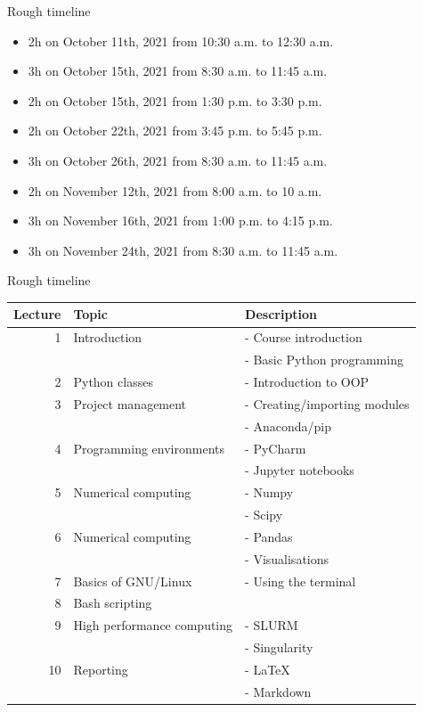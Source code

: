 \documentclass[10pt]{beamer}
\begin{document}
\begin{frame}[label={sec:orgb2e396a}]{Rough timeline}
\begin{itemize}
\item 2h on October 11th, 2021 from 10:30 a.m. to 12:30 a.m.
\item 3h on October 15th, 2021 from 8:30 a.m. to 11:45 a.m.
\item 2h on October 15th, 2021 from 1:30 p.m. to 3:30 p.m.
\item 2h on October 22th, 2021 from 3:45 p.m. to 5:45 p.m.
\item 3h on October 26th, 2021 from 8:30 a.m. to 11:45 a.m.
\item 2h on November 12th, 2021 from 8:00 a.m. to 10 a.m.
\item 3h on November 16th, 2021 from 1:00 p.m. to 4:15 p.m.
\item 3h on November 24th, 2021 from 8:30 a.m. to 11:45 a.m.
\end{itemize}
\end{frame}

\begin{frame}[label={sec:orgf42ce7b}]{Rough timeline}
\begin{center}
\scriptsize
\begin{tabular}{rll}
\hline
Lecture & Topic & Description\\
\hline
1 & Introduction & - Course introduction\\
 &  & - Basic Python programming\\
2 & Python classes & - Introduction to OOP\\
3 & Project management & - Creating/importing modules\\
 &  & - Anaconda/pip\\
4 & Programming environments & - PyCharm\\
 &  & - Jupyter notebooks\\
5 & Numerical computing & - Numpy\\
 &  & - Scipy\\
6 & Numerical computing & - Pandas\\
 &  & - Visualisations\\
7 & Basics of GNU/Linux & - Using the terminal\\
8 & Bash scripting & \\
9 & High performance computing & - SLURM\\
 &  & - Singularity\\
10 & Reporting & - \LaTeX{}\\
 &  & - Markdown\\
\hline
\end{tabular}
\end{center}
\end{frame}
\end{document}
